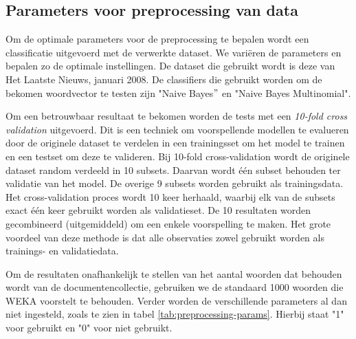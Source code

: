 \subsection{Parameters voor preprocessing van data}

Om de optimale parameters voor de preprocessing te bepalen wordt een classificatie uitgevoerd met de verwerkte dataset. We vari\"eren de parameters en bepalen zo de optimale instellingen. De dataset die gebruikt wordt is deze van Het Laatste Nieuws, januari 2008. De classifiers die gebruikt worden om de bekomen woordvector te testen zijn "Naive Bayes$"$ en "Naive Bayes Multinomial". 

Om een betrouwbaar resultaat te bekomen worden de tests met een \textit{10-fold cross validation}\label{10-fold-cv} uitgevoerd. Dit is een techniek om voorspellende modellen te evalueren door de originele dataset te verdelen in een trainingsset om het model te trainen en een testset om deze te valideren. Bij 10-fold cross-validation\label{cross-val} wordt de originele dataset random verdeeld in 10 subsets. Daarvan wordt \'e\'en subset behouden ter validatie van het model. De overige 9 subsets worden gebruikt als trainingsdata. Het cross-validation proces wordt 10 keer herhaald, waarbij elk van de subsets exact \'e\'en keer gebruikt worden als validatieset. De 10 resultaten worden gecombineerd (uitgemiddeld) om een enkele voorspelling te maken. Het grote voordeel van deze methode is dat alle observaties zowel gebruikt worden als trainings- en validatiedata. 

Om de resultaten onafhankelijk te stellen van het aantal woorden dat behouden wordt van de documentencollectie, gebruiken we de standaard 1000 woorden die WEKA voorstelt te behouden. Verder worden de verschillende parameters al dan niet ingesteld, zoals te zien in tabel \ref{tab:preprocessing-params}. Hierbij staat "1" voor gebruikt en "0" voor niet gebruikt. 


